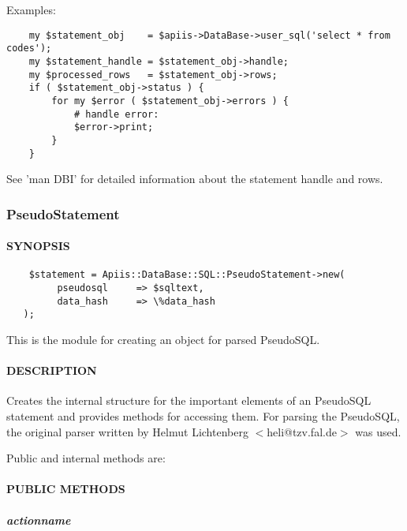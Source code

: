 Examples:

\begin{verbatim}
    my $statement_obj    = $apiis->DataBase->user_sql('select * from codes');
    my $statement_handle = $statement_obj->handle;
    my $processed_rows   = $statement_obj->rows;
    if ( $statement_obj->status ) {
        for my $error ( $statement_obj->errors ) {
            # handle error:
            $error->print;
        }
    }
\end{verbatim}


See 'man DBI' for detailed information about the statement handle and rows.

\subsubsection{PseudoStatement\label{PseudoStatement}}




\paragraph*{SYNOPSIS\label{PseudoStatement_SYNOPSIS}}
\begin{verbatim}
    $statement = Apiis::DataBase::SQL::PseudoStatement->new(
         pseudosql     => $sqltext,
         data_hash     => \%data_hash
   );
\end{verbatim}


This is the module for creating an object for parsed PseudoSQL.

\paragraph*{DESCRIPTION\label{PseudoStatement_DESCRIPTION}}


Creates the internal structure for the important elements of an PseudoSQL statement and provides methods for accessing them.
For parsing the PseudoSQL, the original parser written by Helmut Lichtenberg $<$heli@tzv.fal.de$>$ was used.



Public and internal methods are:

\paragraph*{PUBLIC METHODS\label{PseudoStatement_PUBLIC_METHODS}}
\subparagraph*{actionname\label{PseudoStatement_actionname}}


